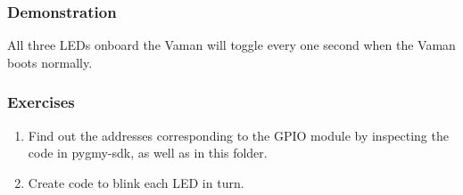\subsubsection{Demonstration}
All three LEDs onboard the Vaman will toggle every one second when the Vaman
boots normally.

\subsubsection{Exercises}
\begin{enumerate}[resume]
    \item Find out the addresses corresponding to the GPIO module by inspecting
    the code in pygmy-sdk, as well as in this folder.
    \item Create code to blink each LED in turn.
\end{enumerate}